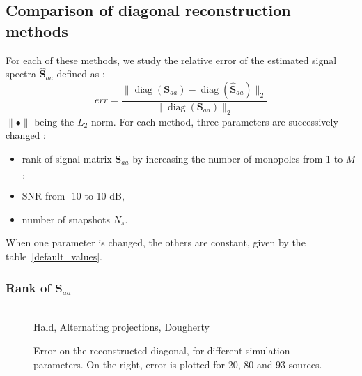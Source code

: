 \documentclass[fontsize=12pt,DIV13,paper=a4,abstract=true,titlepage=false]{scrartcl}
\newcommand{\bo}[1]{ \mathbf{#1} }
\begin{document}
\subsection{Comparison of diagonal reconstruction methods}
For each of these methods, we study the relative error of the estimated signal spectra $\hat{\bo{S}}_{aa}$ defined as : 
\begin{equation}
    err = \frac{\| \operatorname{diag}(\bo{S}_{aa} ) - \operatorname{diag}(\hat{\bo{S}}_{aa})\|_2}{\|\operatorname{diag}(\bo{S}_{aa} ) \|_2}
\end{equation}
$\|\bullet\|$ being the $L_2$ norm. For each method, three parameters are successively changed : 
\begin{itemize}
    \item rank of signal matrix $\bo{S}_{aa}$ by increasing the number of monopoles from 1 to $M$,
    \item SNR from -10 to 10 dB,
    \item number of snapshots $N_s$.
\end{itemize}
When one parameter is changed, the others are constant, given by the table~\ref{default_values}.\\

\subsubsection{Rank of $\bo{S}_{aa}$}


\begin{figure}
	\hspace{-0.1\textwidth}
	\begin{minipage}{1.2\textwidth}
		\centering
		
		\hspace{-0.2cm}
		\hspace{-0.3cm} \hfill\\
		 Hald, 
		 Alternating projections, 
		 Dougherty\\
	\end{minipage}
	\caption{ Error on the reconstructed diagonal, for different simulation parameters. On the right, error is plotted for 20, 80 and 93 sources.}
\end{figure}












%


% 
\end{document}
